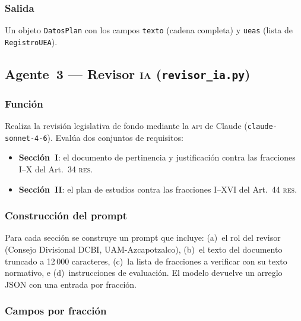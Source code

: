 \documentclass[11pt,a4paper]{article}
\newcommand{\RES}{\textsc{res}}
\newcommand{\IA}{\textsc{ia}}
\begin{document}
\subsubsection{Salida}

Un objeto \texttt{DatosPlan} con los campos \texttt{texto} (cadena completa) y
\texttt{ueas} (lista de \texttt{RegistroUEA}).

\subsection{Agente~3 --- Revisor \IA{} (\texttt{revisor\_ia.py})}

\subsubsection{Función}

Realiza la revisión legislativa de fondo mediante la \textsc{api} de Claude
(\texttt{claude-sonnet-4-6}). Evalúa dos conjuntos de requisitos:

\begin{itemize}[nosep]
  \item \textbf{Sección~I}: el documento de pertinencia y justificación contra las
        fracciones I--X del Art.\ 34 \RES{}.
  \item \textbf{Sección~II}: el plan de estudios contra las fracciones I--XVI del
        Art.\ 44 \RES{}.
\end{itemize}

\subsubsection{Construcción del prompt}

Para cada sección se construye un prompt que incluye: (a)~el rol del revisor
(Consejo Divisional DCBI, UAM-Azcapotzalco), (b)~el texto del documento truncado a
12\,000 caracteres, (c)~la lista de fracciones a verificar con su texto normativo,
e (d)~instrucciones de evaluación. El modelo devuelve un arreglo JSON con una
entrada por fracción.

\subsubsection{Campos por fracción}
\end{document}
